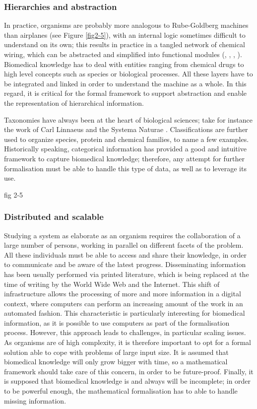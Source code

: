 \subsubsection{Hierarchies and abstraction}

In practice, organisms are probably more analogous to Rube-Goldberg machines than airplanes (see Figure \ref{fig2-5}), with an internal logic sometimes difficult to understand on its own; this results in practice in a tangled network of chemical wiring, which can be abstracted and simplified into functional modules (\cite{hartwell1999molecular}, \cite{ravasz2002hierarchical}, \cite{machado2011modeling}, \cite{fisher2007executable}). Biomedical knowledge has to deal with entities ranging from chemical drugs to high level concepts such as species or biological processes. All these layers have to be integrated and linked in order to understand the machine as a whole. In this regard, it is critical for the formal framework to support abstraction and enable the representation of hierarchical information.

Taxonomies have always been at the heart of biological sciences; take for instance the work of Carl Linnaeus and the Systema Naturae \citep{von1770systema}. Classifications are further used to organize species, protein and chemical families, to name a few examples. Historically speaking, categorical information has provided a good and intuitive framework to capture biomedical knowledge; therefore, any attempt for further formalisation must be able to handle this type of data, as well as to leverage its use.

fig 2-5

\subsubsection{Distributed and scalable}

Studying a system as elaborate as an organism requires the collaboration of a large number of persons, working in parallel on different facets of the problem. All these individuals must be able to access and share their knowledge, in order to communicate and be aware of the latest progress. Disseminating information has been usually performed via printed literature, which is being replaced at the time of writing by the World Wide Web and the Internet. This shift of infrastructure allows the processing of more and more information in a digital context, where computers can perform an increasing amount of the work in an automated fashion. This characteristic is particularly interesting for biomedical information, as it is possible to use computers as part of the formalisation process. However, this approach leads to challenges, in particular scaling issues. As organisms are of high complexity, it is therefore important to opt for a formal solution able to cope with problems of large input size. It is assumed that biomedical knowledge will only grow bigger with time, so a mathematical framework should take care of this concern, in order to be future-proof. Finally, it is supposed that biomedical knowledge is and always will be incomplete; in order to be powerful enough, the mathematical formalisation has to able to handle missing information.

